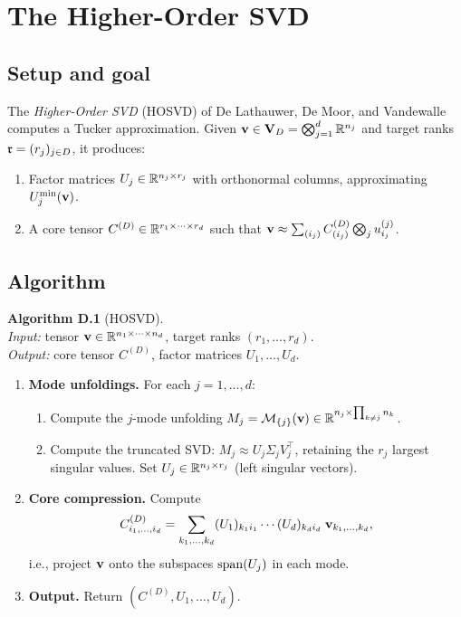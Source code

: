 \section{The Higher-Order SVD}
\label{app:alg:hosvd}

\subsection*{Setup and goal}

The \emph{Higher-Order SVD} (HOSVD) of De Lathauwer, De Moor, and
Vandewalle~\cite{DeLathauwer2000} computes a Tucker approximation.
Given $\mathbf{v} \in \mathbf{V}_D = \bigotimes_{j=1}^d \mathbb{R}^{n_j}$ and target ranks
$\mathfrak{r} = (r_j)_{j \in D}$, it produces:
\begin{enumerate}
\item[(i)] Factor matrices $U_j \in \mathbb{R}^{n_j \times r_j}$ with
    orthonormal columns, approximating $U^{\min}_{j}(\mathbf{v})$.
\item[(ii)] A core tensor
    $C^{(D)} \in \mathbb{R}^{r_1 \times \cdots \times r_d}$ such that
    $\mathbf{v} \approx \sum_{(i_j)} C^{(D)}_{(i_j)}
    \bigotimes_j u_{i_j}^{(j)}$.
\end{enumerate}

\subsection*{Algorithm}

\noindent\textbf{Algorithm D.1} (HOSVD).\\
\textit{Input:} tensor $\mathbf{v} \in \mathbb{R}^{n_1 \times \cdots \times n_d}$,
target ranks $(r_1,\ldots,r_d)$.\\
\textit{Output:} core tensor $C^{(D)}$, factor matrices
$U_1,\ldots,U_d$.
\begin{enumerate}
\item \textbf{Mode unfoldings.} For each $j = 1,\ldots,d$:
    \begin{enumerate}
    \item Compute the $j$-mode unfolding
        $M_j = \mathcal{M}_{\{j\}}(\mathbf{v}) \in \mathbb{R}^{n_j \times \prod_{k \neq j} n_k}$.
    \item Compute the truncated SVD: $M_j \approx U_j \Sigma_j V_j^\top$,
        retaining the $r_j$ largest singular values.
        Set $U_j \in \mathbb{R}^{n_j \times r_j}$ (left singular vectors).
    \end{enumerate}
\item \textbf{Core compression.} Compute
    \begin{equation*}
        C^{(D)}_{i_1,\ldots,i_d}
        = \sum_{k_1,\ldots,k_d}
          (U_1)_{k_1 i_1} \cdots (U_d)_{k_d i_d}\;
          \mathbf{v}_{k_1,\ldots,k_d},
    \end{equation*}
    i.e., project $\mathbf{v}$ onto the subspaces $\mathrm{span}(U_j)$ in each mode.
\item \textbf{Output.} Return $(C^{(D)}, U_1,\ldots,U_d)$.
\end{enumerate}

